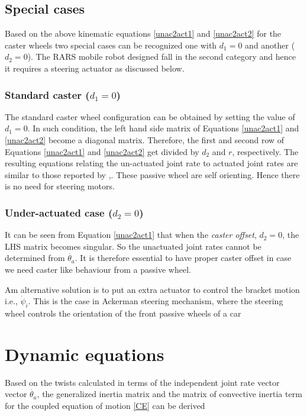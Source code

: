 \subsection{Special cases}
Based on the above kinematic equations \ref{unac2act1} and \ref{unac2act2} for the caster wheels two special cases can be recognized one with $d_1=0$ and another ($d_2=0$). The RARS mobile robot designed fall in the second category and hence it requires a steering actuator as discussed below.  
\subsubsection{Standard caster ($d_1=0$) }
The  standard caster wheel configuration can be obtained by setting the value of $d_1=0$. In such condition, the left hand side matrix of  Equations \ref{unac2act1} and \ref{unac2act2} become  a diagonal matrix. Therefore, the first and second row of Equations \ref{unac2act1} and \ref{unac2act2} get divided by $d_2$ and $r$, respectively. The resulting  equations relating the un-actuated joint rate to  actuated joint rates are similar to those reported by \cite{saha1991dynamics},\cite{angeles2013fundamentals}. These passive wheel are self orienting. Hence there is no need for steering motors. 
\subsubsection{Under-actuated case ($d_2=0$)}
It can be seen from Equation \ref{unac2act1} that when the \textit{caster offset}, $d_2=0$, the LHS matrix becomes singular. So the unactuated joint rates cannot be determined from $\dot{\theta_a}$. It is therefore essential to have proper caster offset in case we need caster like behaviour from a passive wheel. 

Am alternative solution is to put an extra actuator to control the bracket motion i.e., $\dot\psi_i$. This is the case in Ackerman steering mechanism, where the steering wheel controls the orientation of the front passive wheels of a car
\section{Dynamic equations}
Based on the twists calculated in terms of the independent joint rate vector vector $\dot{\theta_a}$,  the generalized inertia matrix and the matrix of convective inertia term for the coupled equation of motion \ref{CE} can be derived 
